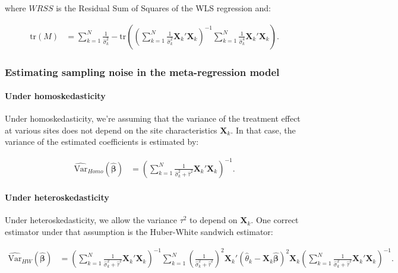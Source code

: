 \documentclass[
]{book}
\theoremstyle{definition}
\theoremstyle{definition}
\theoremstyle{definition}
\theoremstyle{definition}
\theoremstyle{remark}
\begin{document}
where \(WRSS\) is the Residual Sum of Squares of the WLS regression and:

\begin{align*}
\text{tr}(M) & = \sum_{k=1}^N\frac{1}{\hat{\sigma}^2_k} -\text{tr}\left(\left(\sum_{k=1}^N\frac{1}{\hat{\sigma}^2_k}\mathbf{X}_k'\mathbf{X}_k\right)^{-1}\sum_{k=1}^N\frac{1}{\hat{\sigma}^4_k}\mathbf{X}_k'\mathbf{X}_k\right).
\end{align*}

\hypertarget{estimating-sampling-noise-in-the-meta-regression-model}{%
\subsubsection{Estimating sampling noise in the meta-regression model}\label{estimating-sampling-noise-in-the-meta-regression-model}}

\hypertarget{under-homoskedasticity}{%
\paragraph{Under homoskedasticity}\label{under-homoskedasticity}}

Under homoskedasticity, we're assuming that the variance of the treatment effect at various sites does not depend on the site characteristics \(\mathbf{X}_k\).
In that case, the variance of the estimated coefficients is estimated by:

\begin{align*}
\hat{\text{Var}}_{Homo}(\hat{\mathbf{\beta}}) & = \left(\sum_{k=1}^N\frac{1}{\hat{\sigma}^2_k+\hat{\tau}^2}\mathbf{X}_k'\mathbf{X}_k\right)^{-1}.
\end{align*}

\hypertarget{under-heteroskedasticity}{%
\paragraph{Under heteroskedasticity}\label{under-heteroskedasticity}}

Under heteroskedasticity, we allow the variance \(\tau^2\) to depend on \(\mathbf{X}_k\).
One correct estimator under that assumption is the Huber-White sandwich estimator:

\begin{align*}
\hat{\text{Var}}_{HW}(\hat{\mathbf{\beta}}) & = \left(\sum_{k=1}^N\frac{1}{\hat{\sigma}^2_k+\hat{\tau}^2}\mathbf{X}_k'\mathbf{X}_k\right)^{-1}
                                                  \sum_{k=1}^N\left(\frac{1}{\hat{\sigma}^2_k+\hat{\tau}^2}\right)^2
                                                  \mathbf{X}_k'(\hat{\theta}_k-\mathbf{X}_k\hat{\mathbf{\beta}})^2\mathbf{X}_k
                                                  \left(\sum_{k=1}^N\frac{1}{\hat{\sigma}^2_k+\hat{\tau}^2}\mathbf{X}_k'\mathbf{X}_k\right)^{-1}.
\end{align*}
\end{document}
